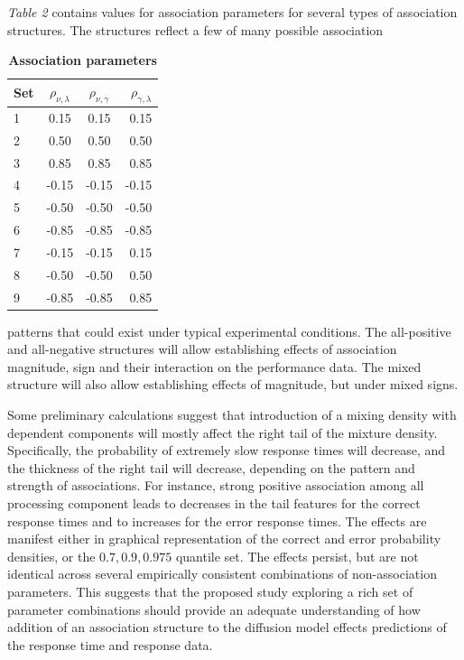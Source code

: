 \documentclass[12pt]{article}
\begin{document}
	\emph{Table 2} contains values for association parameters for several types of association structures. The structures reflect a few of many possible association
\begin{table}[H]
\centering
\caption{\textbf{Association parameters}}
\label{tab:2}
\begin{tabular}{|l|c|c|r|}
\hline
Set & $\rho_{\nu,\lambda}$ & $\rho_{\nu,\gamma}$ & $\rho_{\gamma,\lambda}$ \\ \hline
1 & 0.15 & 0.15 & 0.15 \\ \hline
2 & 0.50 & 0.50 & 0.50 \\ \hline
3 & 0.85 & 0.85 & 0.85 \\ \hline
4 & -0.15 & -0.15 & -0.15 \\ \hline
5 & -0.50 & -0.50 & -0.50 \\ \hline
6 & -0.85 & -0.85 & -0.85 \\ \hline
7 & -0.15 & -0.15 & 0.15 \\ \hline
8 & -0.50 & -0.50 & 0.50 \\ \hline
9 & -0.85 & -0.85 & 0.85 \\ \hline
\end{tabular}
\end{table}
\noindent patterns that could exist under typical experimental conditions. The all-positive and all-negative structures will allow establishing effects of association magnitude, sign and their interaction on the performance data. The mixed structure will also allow establishing effects of magnitude, but under mixed signs.  

	Some preliminary calculations suggest that introduction of a mixing density with dependent components will mostly affect the right tail of the mixture density. Specifically, the probability of extremely slow response times will decrease, and the thickness of the right tail will decrease, depending on the pattern and strength of associations. For instance, strong positive association among all processing component leads to decreases in the tail features for the correct response times and to increases for the error response times. The effects are manifest either in graphical representation of the correct and error probability densities, or the ${0.7, 0.9, 0.975}$ quantile set. The effects persist, but are not identical across several empirically consistent combinations of non-association parameters. This suggests that the proposed study exploring a rich set of parameter combinations should provide an adequate understanding of how addition of an association structure to the diffusion model effects predictions of the response time and response data. 
\end{document}

